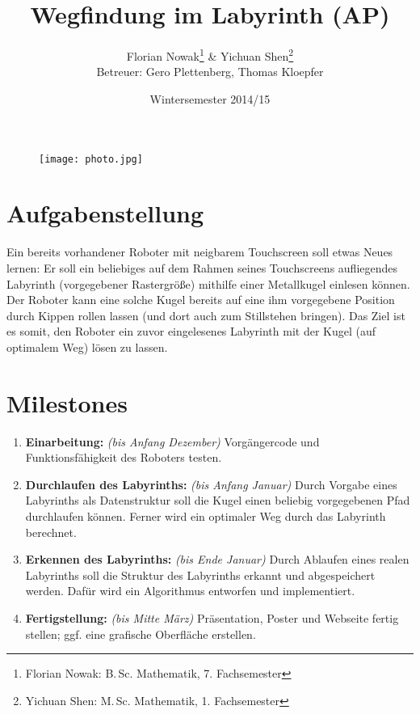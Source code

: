 \documentclass[ngerman]{scrartcl}
\title{Wegfindung im Labyrinth (AP)}
\author{
    Florian Nowak\footnote{Florian Nowak: B.\,Sc. Mathematik, 7. Fachsemester}\; \& Yichuan Shen\footnote{Yichuan Shen: M.\,Sc. Mathematik, 1. Fachsemester}\\
    Betreuer: Gero Plettenberg, Thomas Kloepfer
}
\date{Wintersemester 2014/15}
\begin{document}

\maketitle

\begin{figure}[h]
    \centering
    \texttt{[image: photo.jpg]}
\end{figure}

\section*{Aufgabenstellung}

Ein bereits vorhandener Roboter mit neigbarem Touchscreen soll etwas Neues lernen: Er soll ein beliebiges auf dem Rahmen seines Touchscreens aufliegendes Labyrinth (vorgegebener Rastergröße) mithilfe einer Metallkugel einlesen können. Der Roboter kann eine solche Kugel bereits auf eine ihm vorgegebene Position durch Kippen rollen lassen (und dort auch zum Stillstehen bringen). Das Ziel ist es somit, den Roboter ein zuvor eingelesenes Labyrinth mit der Kugel (auf optimalem Weg) lösen zu lassen.

\section*{Milestones}
\begin{enumerate}
    \item \textbf{Einarbeitung:} \textit{(bis Anfang Dezember)} Vorgängercode und Funktionsfähigkeit des Roboters testen.
    \item \textbf{Durchlaufen des Labyrinths:} \textit{(bis Anfang Januar)} Durch Vorgabe eines Labyrinths als Datenstruktur soll die Kugel einen beliebig vorgegebenen Pfad durchlaufen können. Ferner wird ein optimaler Weg durch das Labyrinth berechnet.
    \item \textbf{Erkennen des Labyrinths:} \textit{(bis Ende Januar)} Durch Ablaufen eines realen Labyrinths soll die Struktur des Labyrinths erkannt und abgespeichert werden. Dafür wird ein Algorithmus entworfen und implementiert.
    \item \textbf{Fertigstellung:} \textit{(bis Mitte März)} Präsentation, Poster und Webseite fertig stellen; ggf. eine grafische Oberfläche erstellen.
\end{enumerate}
\end{document}
